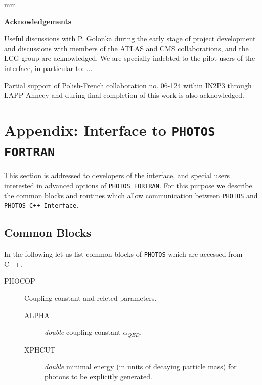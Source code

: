 \documentclass[]{Photos_interface_design}
\begin{document}
 mm

\centerline{\large\bf Acknowledgements}


Useful discussions with P. Golonka during the early stage of project development and discussions 
with members of the ATLAS and CMS collaborations, and the LCG group are acknowledged.
We are specially indebted to the pilot users of the interface, in particular to:
...

Partial support of Polish-French collaboration
no. 06-124 within IN2P3 through LAPP Annecy and 
during final completion of this work is
also acknowledged.

\newpage

{}







\newpage
\appendix

\section{Appendix: Interface to {\tt PHOTOS FORTRAN}}
\label{Interface to PHOTOS}

This section is addressed to developers of the interface, 
and special users interested in advanced options of {\tt PHOTOS FORTRAN}.
For this purpose we describe the common blocks and routines which allow
communication between {\tt PHOTOS} and {\tt PHOTOS C++ Interface}. 

\subsection{Common Blocks}

In the following let us list common blocks of {\tt PHOTOS} which are accessed
from C++.

\begin{description}
\item[PHOCOP] Coupling constant and releted parameters.
    \begin{description}
	\item[ALPHA]  \textit{double}  coupling constant $\alpha_{QED}$.
	\item[XPHCUT] \textit{double} minimal energy (in units of decaying particle mass) for photons to be explicitly generated.
    \end{description}
\end{description}
\end{document}

